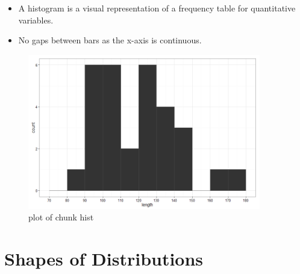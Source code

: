 \documentclass[12pt]{article}
\begin{document}
\begin{itemize}
\itemsep1pt\parskip0pt
\item
  A histogram is a visual representation of a frequency table for
  quantitative variables.
\item
  No gaps between bars as the x-axis is continuous.
\end{itemize}

\begin{figure}[H]
\centering
\includegraphics[width=4in]{figure/hist-1.png}
\caption{plot of chunk hist}
\end{figure}

\section{Shapes of Distributions}\label{shapes-of-distributions}
\end{document}
